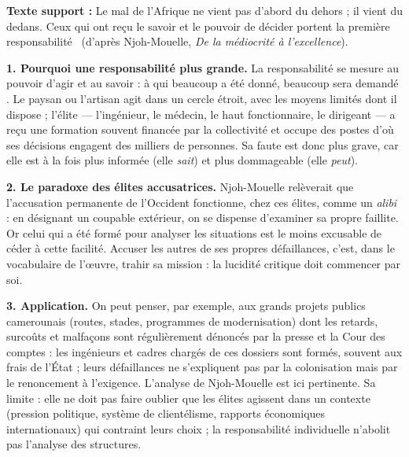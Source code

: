 \documentclass[11pt]{article}
\begin{document}
\begin{corrige}

\textbf{Texte support :} \guillemotleft Le mal de l'Afrique ne vient pas d'abord du dehors ; il vient du dedans. Ceux qui ont reçu le savoir et le pouvoir de décider portent la première responsabilité \guillemotright\ (d'après Njoh-Mouelle, \emph{De la médiocrité à l'excellence}).

\textbf{1. Pourquoi une responsabilité plus grande.} La responsabilité se mesure au pouvoir d'agir et au savoir : \guillemotleft à qui beaucoup a été donné, beaucoup sera demandé \guillemotright. Le paysan ou l'artisan agit dans un cercle étroit, avec les moyens limités dont il dispose ; l'élite — l'ingénieur, le médecin, le haut fonctionnaire, le dirigeant — a reçu une formation souvent financée par la collectivité et occupe des postes d'où ses décisions engagent des milliers de personnes. Sa faute est donc plus grave, car elle est à la fois plus informée (elle \emph{sait}) et plus dommageable (elle \emph{peut}).

\textbf{2. Le paradoxe des élites accusatrices.} Njoh-Mouelle relèverait que l'accusation permanente de l'Occident fonctionne, chez ces élites, comme un \emph{alibi} : en désignant un coupable extérieur, on se dispense d'examiner sa propre faillite. Or celui qui a été formé pour analyser les situations est le moins excusable de céder à cette facilité. Accuser les autres de ses propres défaillances, c'est, dans le vocabulaire de l'œuvre, \guillemotleft trahir sa mission \guillemotright : la lucidité critique doit commencer par soi.

\textbf{3. Application.} On peut penser, par exemple, aux grands projets publics camerounais (routes, stades, programmes de modernisation) dont les retards, surcoûts et malfaçons sont régulièrement dénoncés par la presse et la Cour des comptes : les ingénieurs et cadres chargés de ces dossiers sont formés, souvent aux frais de l'État ; leurs défaillances ne s'expliquent pas par la colonisation mais par le renoncement à l'exigence. L'analyse de Njoh-Mouelle est ici pertinente. Sa limite : elle ne doit pas faire oublier que les élites agissent dans un contexte (pression politique, système de clientélisme, rapports économiques internationaux) qui contraint leurs choix ; la responsabilité individuelle n'abolit pas l'analyse des structures.
\end{corrige}
\end{document}
